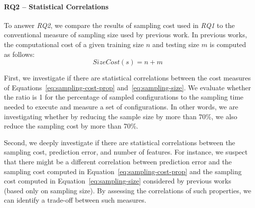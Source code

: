 




\paragraph{RQ2 – Statistical Correlations}
To answer \textit{RQ2}, we compare the results of sampling cost used in \textit{RQ1} to the conventional measure of sampling size used by previous work.
In previous works, the computational cost of a given training size $n$ and testing size $m$ is computed as follows:
\begin{equation}
    SizeCost(s) = n+m
    \label{eq:sampling-size}
\end{equation}



First, we investigate if there are statistical correlations between the cost measures of Equations~\ref{eq:sampling-cost-prop} and~\ref{eq:sampling-size}.
We evaluate whether the ratio is 1 for the percentage of sampled configurations to the sampling time needed to 
execute and measure a set of configurations.
In other words, we are investigating whether by reducing the sample size by more than 70\%, we also reduce the sampling cost by more than 70\%.

Second, we deeply investigate if there are statistical correlations between the sampling cost, prediction error, and number of features. %
For instance, we suspect that there might be a different correlation between prediction error and the sampling cost computed in Equation~\ref{eq:sampling-cost-prop} and the sampling cost computed in Equation~\ref{eq:sampling-size} considered by previous works (based only on sampling size).
By assessing the correlations of such properties, we can identify a trade-off between such measures.

